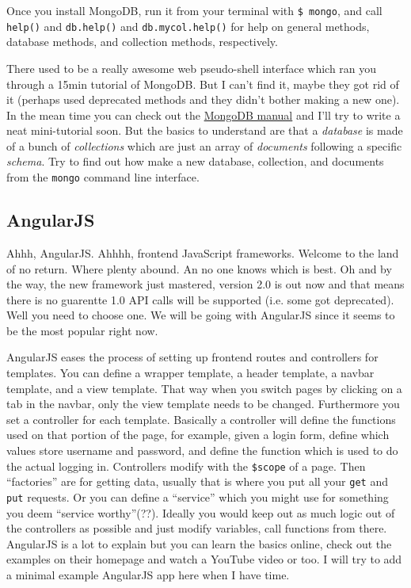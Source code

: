 Once you install MongoDB, run it from your terminal with \texttt{\$ mongo}, and
call \texttt{help()} and  \texttt{db.help()} and  \texttt{db.mycol.help()} for
help on general methods, database methods, and collection methods, respectively.

There used to be a really awesome web pseudo-shell interface which ran you
through a 15min tutorial of MongoDB. But I can't find it, maybe they got rid of
it (perhaps used deprecated methods and they didn't bother making a new one).
In the mean time you can check out the \href{http://docs.mongodb.org/manual/}{MongoDB manual}
and I'll try to write a neat mini-tutorial soon. But the basics to understand
are that a \textit{database} is made of a bunch of \textit{collections} which 
are just an array of \textit{documents} following a specific  \textit{schema}.
Try to find out how make a new database, collection, and documents from the
\texttt{mongo} command line interface. 

\subsection{AngularJS}

\noindent Ahhh, AngularJS. Ahhhh, frontend JavaScript frameworks. Welcome to the
land of no return. Where plenty abound. An no one knows which is best. Oh and
by the way, the new framework just mastered, version 2.0 is out now and that
means there is no guarentte 1.0 API calls will be supported (i.e. some got
deprecated). Well you need to choose one. We will be going with AngularJS since
it seems to be the most popular right now.

AngularJS eases the process of setting up frontend routes and controllers for
templates. You can define a wrapper template, a header template, a navbar
template, and a view template. That way when you switch pages by clicking on
a tab in the navbar, only the view template needs to be changed. Furthermore
you set a controller for each template. Basically a controller will define the 
functions used on that portion of the page, for example, given a login form,
define which values store username and password, and define the function
which is used to do the actual logging in. Controllers modify with the 
\texttt{\$scope} of a page. Then ``factories'' are for getting data, usually
that is where you put all your \texttt{get} and  \texttt{put} requests. Or
you can define a ``service'' which you might use for something you deem
``service worthy''(??). Ideally you would keep out as much logic out of the
controllers as possible and just modify variables, call functions from there.
AngularJS is a lot to explain but you can learn the basics online, check out
the examples on their homepage and watch a YouTube video or too. I will try
to add a minimal example AngularJS app here when I have time.

